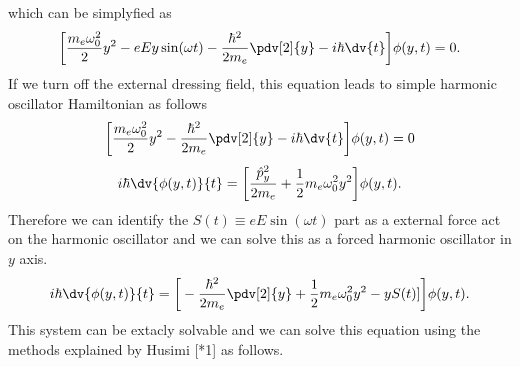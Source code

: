 which can be simplyfied as
\begin{equation} \label{1.29}
  \begin{aligned}
    \bigg[
    \frac{m_e \omega_0^2}{2}y^2
    - {eEy}\sin(\omega t)
    -
    \frac{\hbar^2}{2m_e}
    \pdv[2]{y}
    - i \hbar \dv{t}
    \bigg]
    \phi(y,t) = 0.
  \end{aligned}
\end{equation}
If we turn off the external dressing field, this equation leads to simple harmonic oscillator Hamiltonian as follows
\begin{equation} \label{1.30}
  \begin{aligned}
    \bigg[
    \frac{m_e \omega_0^2}{2}y^2
    -
    \frac{\hbar^2}{2m_e}
    \pdv[2]{y}
    - i \hbar \dv{t}
    \bigg]
    \phi(y,t) = 0
  \end{aligned}
\end{equation}
\begin{equation} \label{1.31}
  \begin{aligned}
     i \hbar \dv{\phi(y,t)}{t} =
    \bigg[
    \frac{\hat{p}_y^2}{2m_e} +
    \frac{1}{2}m_e \omega_0^2y^2
    \bigg]
    \phi(y,t).
  \end{aligned}
\end{equation}
Therefore we can identify the $S(t) \equiv eE\sin(\omega t)$ part as a external force act on the harmonic oscillator and we can solve this as a forced harmonic oscillator in $y$ axis.
\begin{equation} \label{1.32}
  \begin{aligned}
    i \hbar \dv{\phi(y,t)}{t} =
    \bigg[
    -
    \frac{\hbar^2}{2m_e}
    \pdv[2]{y} +
    \frac{1}{2}m_e \omega_0^2y^2
    - yS(t)]
    \bigg]
    \phi(y,t).
  \end{aligned}
\end{equation}
This system can be extacly solvable and we can solve this equation using the methods explained by Husimi [*1] as follows.

